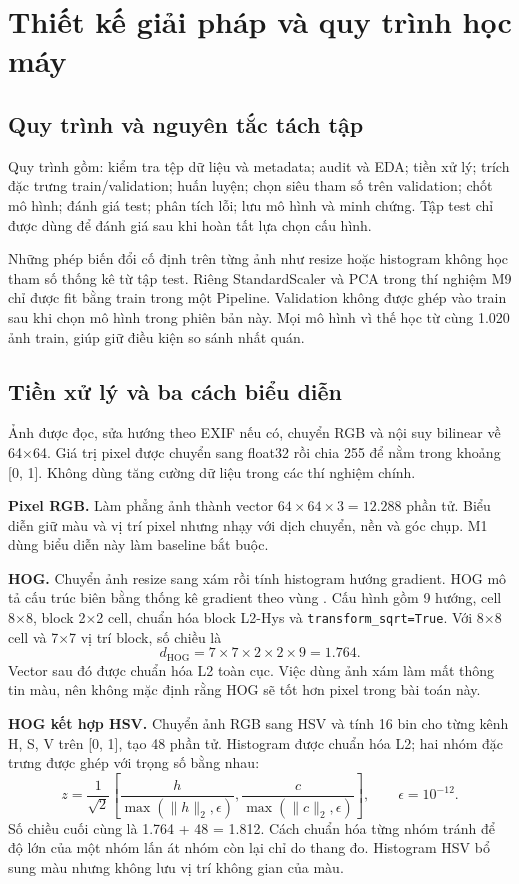 \section{Thiết kế giải pháp và quy trình học máy}
\subsection{Quy trình và nguyên tắc tách tập}
Quy trình gồm: kiểm tra tệp dữ liệu và metadata; audit và EDA; tiền xử lý; trích đặc trưng train/validation; huấn luyện; chọn siêu tham số trên validation; chốt mô hình; đánh giá test; phân tích lỗi; lưu mô hình và minh chứng. Tập test chỉ được dùng để đánh giá sau khi hoàn tất lựa chọn cấu hình.

Những phép biến đổi cố định trên từng ảnh như resize hoặc histogram không học tham số thống kê từ tập test. Riêng StandardScaler và PCA trong thí nghiệm M9 chỉ được fit bằng train trong một Pipeline. Validation không được ghép vào train sau khi chọn mô hình trong phiên bản này. Mọi mô hình vì thế học từ cùng 1.020 ảnh train, giúp giữ điều kiện so sánh nhất quán.

\subsection{Tiền xử lý và ba cách biểu diễn}
Ảnh được đọc, sửa hướng theo EXIF nếu có, chuyển RGB và nội suy bilinear về 64\(\times\)64. Giá trị pixel được chuyển sang float32 rồi chia 255 để nằm trong khoảng [0, 1]. Không dùng tăng cường dữ liệu trong các thí nghiệm chính.

\textbf{Pixel RGB.} Làm phẳng ảnh thành vector \(64\times64\times3=12.288\) phần tử. Biểu diễn giữ màu và vị trí pixel nhưng nhạy với dịch chuyển, nền và góc chụp. M1 dùng biểu diễn này làm baseline bắt buộc.

\textbf{HOG.} Chuyển ảnh resize sang xám rồi tính histogram hướng gradient. HOG mô tả cấu trúc biên bằng thống kê gradient theo vùng \cite{hog}. Cấu hình gồm 9 hướng, cell 8\(\times\)8, block 2\(\times\)2 cell, chuẩn hóa block L2-Hys và \texttt{transform\_sqrt=True}. Với 8\(\times\)8 cell và 7\(\times\)7 vị trí block, số chiều là
\[
d_{\mathrm{HOG}}=7\times7\times2\times2\times9=1.764.
\]
Vector sau đó được chuẩn hóa L2 toàn cục. Việc dùng ảnh xám làm mất thông tin màu, nên không mặc định rằng HOG sẽ tốt hơn pixel trong bài toán này.

\textbf{HOG kết hợp HSV.} Chuyển ảnh RGB sang HSV và tính 16 bin cho từng kênh H, S, V trên [0, 1], tạo 48 phần tử. Histogram được chuẩn hóa L2; hai nhóm đặc trưng được ghép với trọng số bằng nhau:
\[
z=\frac{1}{\sqrt{2}}\left[\frac{h}{\max(\|h\|_2,\epsilon)},
\frac{c}{\max(\|c\|_2,\epsilon)}\right],\qquad \epsilon=10^{-12}.
\]
Số chiều cuối cùng là 1.764 + 48 = 1.812. Cách chuẩn hóa từng nhóm tránh để độ lớn của một nhóm lấn át nhóm còn lại chỉ do thang đo. Histogram HSV bổ sung màu nhưng không lưu vị trí không gian của màu.

